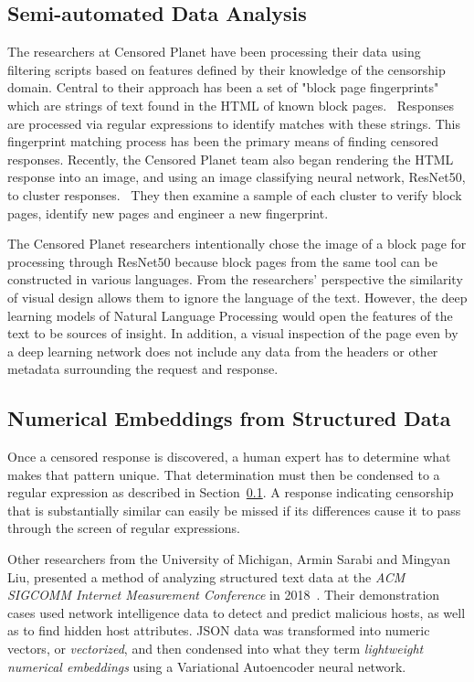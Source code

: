 \subsection{Semi-automated Data Analysis}\label{subsec:dataanalysis}
The researchers at Censored Planet have been processing their data using
filtering scripts based on features defined by their knowledge of the
censorship domain. Central to their approach has been a set of "block page
fingerprints" which are strings of text found in the HTML of known block
pages.~\cite{ceccio_censoredplanetcensoredplanet_2021}  Responses are processed
via regular expressions to identify matches with these strings.  This
fingerprint matching process has been the primary means of finding censored
responses.  Recently, the Censored Planet team also began rendering the HTML
response into an image, and using an image classifying neural network,
ResNet50, to cluster responses.~\cite{raman_measuring_2020} They then examine a
sample of each cluster to verify block pages, identify new pages and engineer a
new fingerprint. 

The Censored Planet researchers intentionally chose the image of a block page
for processing through ResNet50 because block pages from the same tool can be
    constructed in various languages.  From the researchers' perspective the
    similarity of visual design allows them to ignore the language of the text.
    However, the deep learning models of Natural Language Processing would open
    the features of the text to be sources of insight. In addition, a visual
    inspection of the page even by a deep learning network does not include any
    data from the headers or other metadata surrounding the request and
    response.

\subsection{Numerical Embeddings from Structured Data}

Once a censored response is discovered, a human expert has to determine what
makes that pattern unique.  That determination must then be condensed to a
regular expression as described in Section~\ref{subsec:dataanalysis}. A
response indicating censorship that is substantially similar can easily be
missed if its differences cause it to pass through the screen of regular
expressions.

Other researchers from the University of Michigan, Armin Sarabi and Mingyan
Liu, presented a method of analyzing structured text data at the \textit{ACM
SIGCOMM Internet Measurement Conference} in
2018~\cite{sarabi_characterizing_2018}. Their demonstration cases used network
intelligence data to detect and predict malicious hosts, as well as to find
hidden host attributes. JSON data was transformed into numeric vectors, or
\textit{vectorized}, and then condensed into what they term \textit{lightweight
numerical embeddings} using a Variational Autoencoder neural network.

